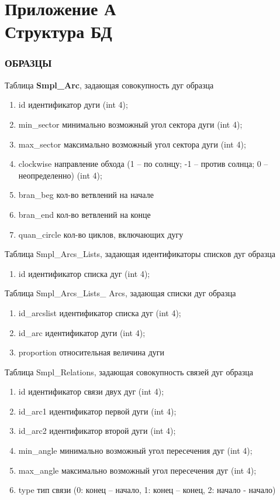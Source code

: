 \appendix
\chapter*{Приложение А\\Структура БД} \label{AppendixA}
\noindent
\subsection*{ОБРАЗЦЫ}
\noindent
Таблица \textbf{Smpl\_Arc}, задающая совокупность дуг образца
\small
\begin{enumerate}
\item id		        	идентификатор дуги (int 4);
\item min\_sector           	минимально возможный угол сектора дуги (int 4);
\item max\_sector          	максимально возможный угол сектора дуги (int 4);
\item clockwise            	направление обхода (1 – по солнцу; -1 – против солнца; 0 – неопределенно) (int 4);
\item bran\_beg            	кол-во ветвлений на начале
\item bran\_end            	кол-во ветвлений на конце
\item quan\_circle        	кол-во циклов, включающих дугу
\end{enumerate}
\normalsize

\noindent 
Таблица Smpl\_Arcs\_Lists, задающая идентификаторы списков дуг образца
\small
\begin{enumerate}
\item id		       	идентификатор списка дуг (int 4);
\end{enumerate}
\normalsize


\noindent 
Таблица Smpl\_Arcs\_Lists\_ Arcs, задающая списки дуг образца
\small
\begin{enumerate}
\item id\_arcslist		идентификатор списка дуг (int 4);
\item id\_arc		идентификатор дуги (int 4);
\item proportion		относительная величина дуги		
\end{enumerate}
\normalsize


\noindent 
Таблица Smpl\_Relations, задающая совокупность связей дуг образца
\small
\begin{enumerate}
\item id		         	идентификатор связи двух дуг (int 4);
\item id\_arc1                 	идентификатор первой дуги (int 4);
\item id\_arc2                 	идентификатор второй дуги (int 4);
\item min\_angle           	минимально возможный угол пересечения дуг (int 4);
\item max\_angle          	максимально возможный угол пересечения дуг (int 4);
\item type			тип связи (0: конец – начало, 1: конец – конец, 2: начало - начало)
\end{enumerate}
\normalsize


